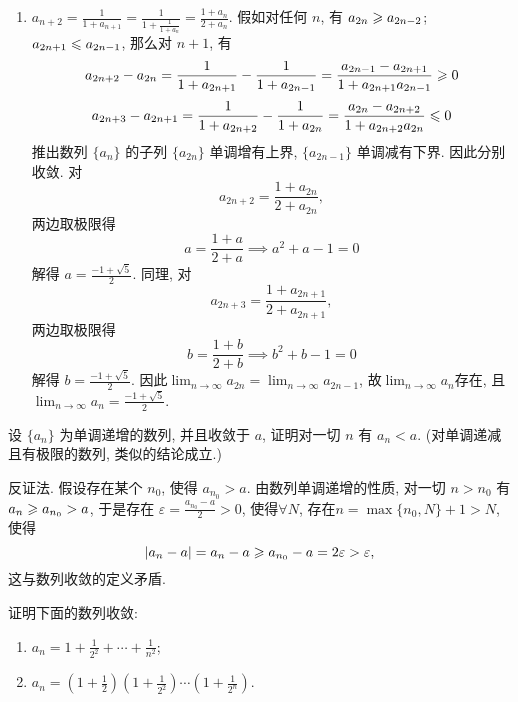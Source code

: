 \begin{solution}
\begin{enumerate}[(1)]
        \item $a_{n+2} = \frac{1}{1+a_{n+1}} = \frac{1}{1+\frac{1}{1+a_n}} = \frac{1+a_n}{2+a_n}$.
              假如对任何 $n$,  有 $a_{2n} \geqslant a_{2n-2}$; $a_{2n+1} \leqslant a_{2n-1}$,  那么对 $n+1$,  有
              $$ a_{2n+2} - a_{2n} = \frac{1}{1+a_{2n+1}} - \frac{1}{1+a_{2n-1}} = \frac{a_{2n-1}-a_{2n+1}}{1+a_{2n+1}a_{2n-1}} \geqslant 0 $$
              $$ a_{2n+3} - a_{2n+1} = \frac{1}{1+a_{2n+2}} - \frac{1}{1+a_{2n}} = \frac{a_{2n}-a_{2n+2}}{1+a_{2n+2}a_{2n}} \leqslant 0 $$
              推出数列 $\{a_n\}$ 的子列 $\{a_{2n}\}$ 单调增有上界,  $\{a_{2n-1}\}$ 单调减有下界. 因此分别收敛. 对$$a_{2n+2} = \frac{1+a_{2n}}{2+a_{2n}}, $$两边取极限得
              $$ a = \frac{1+a}{2+a} \implies a^2 + a - 1 = 0 $$
              解得 $a = \frac{-1+\sqrt{5}}{2}$. 同理,  对$$a_{2n+3} = \frac{1+a_{2n+1}}{2+a_{2n+1}}, $$两边取极限得
              $$ b = \frac{1+b}{2+b} \implies b^2 + b - 1 = 0 $$
              解得 $b = \frac{-1+\sqrt{5}}{2}$.
              因此$\lim_{n \to \infty} a_{2n} = \lim_{n \to \infty} a_{2n-1}$,  故$\lim_{n \to \infty} a_n$存在,  且$\lim_{n \to \infty} a_n = \frac{-1+\sqrt{5}}{2}$.
    \end{enumerate}
\end{solution}

\begin{exercise}[1.C.2]
    设 $\{a_n\}$ 为单调递增的数列,  并且收敛于 $a$,  证明对一切 $n$ 有 $a_n < a$. (对单调递减且有极限的数列,  类似的结论成立.)
\end{exercise}

\begin{solution}
    反证法. 假设存在某个 $n_0$,  使得 $a_{n_0} > a$. 由数列单调递增的性质,  对一切 $n > n_0$ 有 $a_n \geqslant a_{n_0} > a$, 于是存在 $\varepsilon = \frac{a_{n_0} - a}{2} > 0$,  使得$\forall N$,  存在$ n = \max\{n_0,  N\} + 1 > N$,  使得
    $$ |a_n - a| = a_n - a \geqslant a_{n_0} - a = 2\varepsilon > \varepsilon,  $$
    这与数列收敛的定义矛盾.
\end{solution}

\begin{exercise}[1.C.3]
    证明下面的数列收敛:
    \begin{enumerate}[(1)]
        \item $a_n = 1 + \frac{1}{2^2} + \cdots + \frac{1}{n^2}$;
        \item $a_n = \left(1+\frac{1}{2}\right)\left(1+\frac{1}{2^2}\right)\cdots\left(1+\frac{1}{2^n}\right)$.
    \end{enumerate}
\end{exercise}

